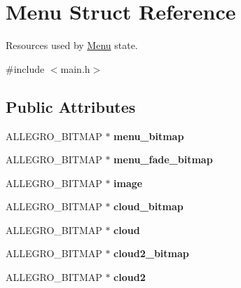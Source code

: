 \hypertarget{structMenu}{\section{\-Menu \-Struct \-Reference}
\label{structMenu}
}


\-Resources used by \hyperlink{structMenu}{\-Menu} state.  




{\ttfamily \#include $<$main.\-h$>$}

\subsection*{\-Public \-Attributes}
\begin{DoxyCompactItemize}
\item 
\hypertarget{structMenu_a0d7b80f34ea24f9c426c75a776dcac8c}{\-A\-L\-L\-E\-G\-R\-O\-\_\-\-B\-I\-T\-M\-A\-P $\ast$ {\bfseries menu\-\_\-bitmap}}\label{structMenu_a0d7b80f34ea24f9c426c75a776dcac8c}

\item 
\hypertarget{structMenu_a4d3a2c17b2882c7adf10a15ba49932b4}{\-A\-L\-L\-E\-G\-R\-O\-\_\-\-B\-I\-T\-M\-A\-P $\ast$ {\bfseries menu\-\_\-fade\-\_\-bitmap}}\label{structMenu_a4d3a2c17b2882c7adf10a15ba49932b4}

\item 
\hypertarget{structMenu_a7ac035a3356434a3ce6eae45f876eba9}{\-A\-L\-L\-E\-G\-R\-O\-\_\-\-B\-I\-T\-M\-A\-P $\ast$ {\bfseries image}}\label{structMenu_a7ac035a3356434a3ce6eae45f876eba9}

\item 
\hypertarget{structMenu_a3423dfa7d8ac4f17d9a78fb78db9e405}{\-A\-L\-L\-E\-G\-R\-O\-\_\-\-B\-I\-T\-M\-A\-P $\ast$ {\bfseries cloud\-\_\-bitmap}}\label{structMenu_a3423dfa7d8ac4f17d9a78fb78db9e405}

\item 
\hypertarget{structMenu_a9abb4b7b9f726884aa378e746857b6f2}{\-A\-L\-L\-E\-G\-R\-O\-\_\-\-B\-I\-T\-M\-A\-P $\ast$ {\bfseries cloud}}\label{structMenu_a9abb4b7b9f726884aa378e746857b6f2}

\item 
\hypertarget{structMenu_a5864eeeb74cf808f83438d85e335d3b4}{\-A\-L\-L\-E\-G\-R\-O\-\_\-\-B\-I\-T\-M\-A\-P $\ast$ {\bfseries cloud2\-\_\-bitmap}}\label{structMenu_a5864eeeb74cf808f83438d85e335d3b4}

\item 
\hypertarget{structMenu_a6ee03b8791791ecca4f9a3b9fb1851c1}{\-A\-L\-L\-E\-G\-R\-O\-\_\-\-B\-I\-T\-M\-A\-P $\ast$ {\bfseries cloud2}}\label{structMenu_a6ee03b8791791ecca4f9a3b9fb1851c1}


\end{DoxyCompactItemize}
